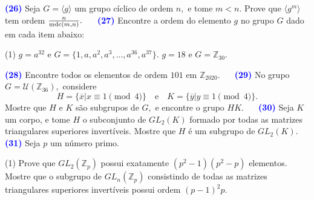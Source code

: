 \documentclass[12pt, a4paper]{article}
\newcommand{\mdc}{{\rm mdc}}
\newcommand{\negrito}[1]{\mbox{\boldmath{$#1$}}}
\begin{document}
\textcolor{blue}{\bf(26)}\label{ex4} Seja $G = \langle g \rangle$ um grupo cíclico de ordem $n,$ e tome $m < n.$ Prove que $\langle g^m \rangle$ tem ordem $\frac{n}{\mdc(m,n)}.$
\textcolor{white}{Oi}\newline\newline
\textcolor{blue}{\bf(27)}\label{ex5} Encontre a ordem do elemento $g$ no grupo $G$ dado em cada item abaixo:
\begin{tasks}[counter-format={(tsk[a])},label-width=3.6ex, label-format = {\bfseries}, column-sep = {0pt}](1)
\task[\textcolor{Floresta}{$\negrito{(a)} $}] $g = a^{32}$ e $G = \{1, a, a^2, a^3, \ldots, a^{36}, a^{37} \}.$
\task[\textcolor{Floresta}{$\negrito{(b)} $}] $g = 18$ e $G = \mathbb{Z}_{30}.$
\end{tasks}
\textcolor{blue}{\bf(28)}\label{ex6} Encontre todos os elementos de ordem $101$ em $\mathbb{Z}_{2020}.$ %
\textcolor{white}{Oi}\newline\newline
\textcolor{blue}{\bf(29)}\label{ex7} No grupo $G = \mathcal{U}(\mathbb{Z}_{36}),$ considere
\[
H = \{ \overline{x} | x \equiv 1\pmod{4} \} \quad \mbox{e} \quad K = \{ \overline{y} | y \equiv 1\pmod{4} \}.
\]
Mostre que $H$ e $K$ são subgrupos de $G,$ e encontre o grupo $HK.$
\textcolor{white}{Oi}\newline\newline
\textcolor{blue}{\bf(30)}\label{ex8} Seja $K$ um corpo, e tome $H$ o subconjunto de $GL_2(K)$ formado por todas as matrizes triangulares superiores invertíveis. Mostre que $H$ é um subgrupo de $GL_2(K).$
\textcolor{white}{Oi}\newline\newline
\textcolor{blue}{\bf(31)}\label{ex8} Seja $p$ um número primo.
\begin{tasks}[counter-format={(tsk[a])},label-width=3.6ex, label-format = {\bfseries}, column-sep = {0pt}](1)
\task[\textcolor{Floresta}{$\negrito{(a)} $}] Prove que $GL_2(\mathbb{Z}_p)$ possui exatamente $(p^2 - 1)(p^2 - p)$ elementos.
\task[\textcolor{Floresta}{$\negrito{(b)} $}] Mostre que o subgrupo de $GL_n(\mathbb{Z}_p)$ consistindo de todas as matrizes triangulares superiores invertíveis possui ordem $(p - 1)^2p.$
\end{tasks}
\end{document}
